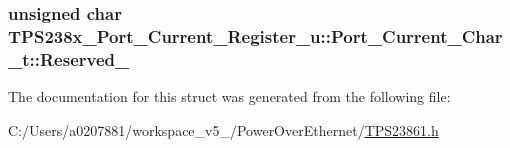 \hypertarget{struct_t_p_s238x___port___current___register__u_1_1_port___current___char__t_a0b4640d32cb54bace424e7259670e8d5}{
\subsubsection[{Reserved\-\_\-15}]{\setlength{\rightskip}{0pt plus 5cm}unsigned char T\-P\-S238x\-\_\-\-Port\-\_\-\-Current\-\_\-\-Register\-\_\-u\-::\-Port\-\_\-\-Current\-\_\-\-Char\-\_\-t\-::\-Reserved\-\_}}\label{struct_t_p_s238x___port___current___register__u_1_1_port___current___char__t_a0b4640d32cb54bace424e7259670e8d5}


The documentation for this struct was generated from the following file\-:\begin{DoxyCompactItemize}
\item 
C\-:/\-Users/a0207881/workspace\-\_\-v5\-\_/\-Power\-Over\-Ethernet/\hyperlink{_t_p_s23861_8h}{T\-P\-S23861.\-h}\end{DoxyCompactItemize}
